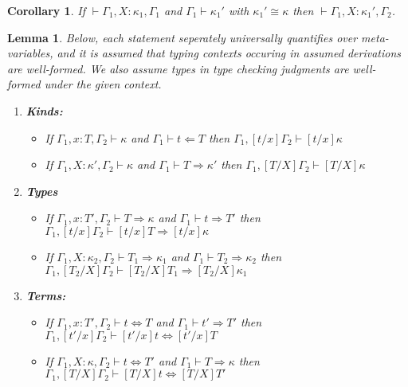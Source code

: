 \documentclass{article}
\newcommand{\tpcheck}[0]{\Leftarrow}
\newcommand{\tpsynth}[0]{\Rightarrow}
\newtheorem{lemma}[theorem]{Lemma}
\newtheorem{corollary}[theorem]{Corollary}
\begin{document}
\begin{corollary}
  \label{cor:ctxt-conv-class}
  If \(\vdash \Gamma_1,X:\kappa_1,\Gamma_1\) and \(\Gamma_1 \vdash \kappa_1'\)
  with \(\kappa_1' \cong \kappa\) then \(\vdash \Gamma_1,X:\kappa_1',\Gamma_2\).
\end{corollary}

\begin{lemma}
  \label{lem:subst-class}
  Below, each statement seperately universally quantifies over meta-variables,
  and it is assumed that typing contexts occuring in assumed derivations are
  well-formed.
  We also assume types in type checking judgments are well-formed under the
  given context.
  \begin{enumerate}
  \item \textbf{Kinds:}
    \begin{itemize}
    \item If \(\Gamma_1,x:T,\Gamma_2 \vdash \kappa\) and \(\Gamma_1 \vdash t
      \tpcheck T\) then \(\Gamma_1,[t/x]\Gamma_2 \vdash [t/x] \kappa\)
      
    \item If \(\Gamma_1,X:\kappa',\Gamma_2 \vdash \kappa\) and \(\Gamma_1 \vdash
      T \tpsynth \kappa'\) then \(\Gamma_1,[T/X]\Gamma_2 \vdash [T/X]\kappa\)
    \end{itemize}
    
  \item \textbf{Types}
    \begin{itemize}
    \item If \(\Gamma_1,x:T',\Gamma_2 \vdash T \tpsynth \kappa\) and \(\Gamma_1 \vdash t
      \tpsynth T'\) then \(\Gamma_1,[t/x]\Gamma_2 \vdash [t/x]T \tpsynth [t/x]\kappa\)
      
    \item If \(\Gamma_1,X:\kappa_2,\Gamma_2 \vdash T_1 \tpsynth \kappa_1\) and \(\Gamma_1
      \vdash T_2 \tpsynth \kappa_2\) then \(\Gamma_1,[T_2/X]\Gamma_2 \vdash [T_2/X]T_1 \tpsynth [T_2/X]\kappa_1\)
    \end{itemize}
    
  \item \textbf{Terms:}
    \begin{itemize}
    \item If \(\Gamma_1,x:T',\Gamma_2 \vdash t \Leftrightarrow T\) and
      \(\Gamma_1 \vdash t' \tpsynth T'\) then \(\Gamma_1,[t'/x]\Gamma_2 \vdash [t'/x]t
      \Leftrightarrow [t'/x]T\)
     
    \item If \(\Gamma_1,X:\kappa,\Gamma_2 \vdash t \Leftrightarrow T'\) and
      \(\Gamma_1 \vdash T \tpsynth \kappa\) then \(\Gamma_1,[T/X]\Gamma_2 \vdash
      [T/X]t \Leftrightarrow [T/X]T'\)
    \end{itemize}
  \end{enumerate}
\end{lemma}
\end{document}
